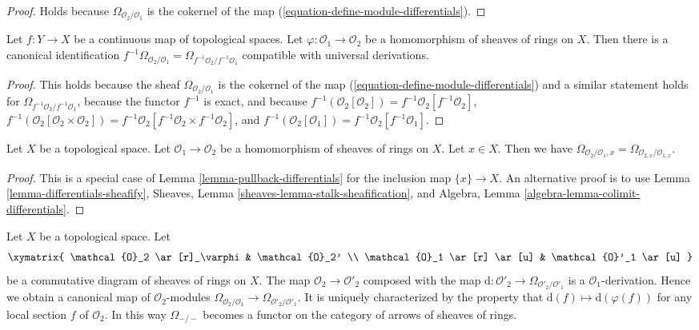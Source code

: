 \begin{proof}
Holds because $\Omega_{\mathcal{O}_2/\mathcal{O}_1}$
is the cokernel of the map (\ref{equation-define-module-differentials}).
\end{proof}

\begin{lemma}
\label{lemma-pullback-differentials}
Let $f : Y \to X$ be a continuous map of topological spaces.
Let $\varphi : \mathcal{O}_1 \to \mathcal{O}_2$
be a homomorphism of sheaves of rings on $X$.
Then there is a canonical identification
$f^{-1}\Omega_{\mathcal{O}_2/\mathcal{O}_1} =
\Omega_{f^{-1}\mathcal{O}_2/f^{-1}\mathcal{O}_1}$
compatible with universal derivations.
\end{lemma}

\begin{proof}
This holds because the sheaf $\Omega_{\mathcal{O}_2/\mathcal{O}_1}$
is the cokernel of the map (\ref{equation-define-module-differentials})
and a similar statement holds for
$\Omega_{f^{-1}\mathcal{O}_2/f^{-1}\mathcal{O}_1}$,
because the functor $f^{-1}$ is exact, and because
$f^{-1}(\mathcal{O}_2[\mathcal{O}_2]) =
f^{-1}\mathcal{O}_2[f^{-1}\mathcal{O}_2]$,
$f^{-1}(\mathcal{O}_2[\mathcal{O}_2 \times \mathcal{O}_2]) =
f^{-1}\mathcal{O}_2[f^{-1}\mathcal{O}_2 \times f^{-1}\mathcal{O}_2]$, and
$f^{-1}(\mathcal{O}_2[\mathcal{O}_1]) =
f^{-1}\mathcal{O}_2[f^{-1}\mathcal{O}_1]$.
\end{proof}

\begin{lemma}
\label{lemma-stalk-module-differentials}
Let $X$ be a topological space. Let $\mathcal{O}_1 \to \mathcal{O}_2$
be a homomorphism of sheaves of rings on $X$. Let $x \in X$. Then we have
$\Omega_{\mathcal{O}_2/\mathcal{O}_1, x} =
\Omega_{\mathcal{O}_{2, x}/\mathcal{O}_{1, x}}$.
\end{lemma}

\begin{proof}
This is a special case of Lemma \ref{lemma-pullback-differentials}
for the inclusion map $\{x\} \to X$. An alternative proof is to use
Lemma \ref{lemma-differentials-sheafify},
Sheaves, Lemma \ref{sheaves-lemma-stalk-sheafification}, and
Algebra, Lemma \ref{algebra-lemma-colimit-differentials}.
\end{proof}

\begin{lemma}
\label{lemma-functoriality-differentials}
Let $X$ be a topological space. Let
$$
\xymatrix{
\mathcal{O}_2 \ar[r]_\varphi & \mathcal{O}_2' \\
\mathcal{O}_1 \ar[r] \ar[u] & \mathcal{O}'_1 \ar[u]
}
$$
be a commutative diagram of sheaves of rings on $X$. The map
$\mathcal{O}_2 \to \mathcal{O}'_2$ composed with the map
$\text{d} : \mathcal{O}'_2 \to \Omega_{\mathcal{O}'_2/\mathcal{O}'_1}$
is a $\mathcal{O}_1$-derivation. Hence we obtain a canonical map of
$\mathcal{O}_2$-modules
$\Omega_{\mathcal{O}_2/\mathcal{O}_1} \to
\Omega_{\mathcal{O}'_2/\mathcal{O}'_1}$.
It is uniquely characterized by the property that
$\text{d}(f) \mapsto \text{d}(\varphi(f))$
for any local section $f$ of $\mathcal{O}_2$.
In this way $\Omega_{-/-}$ becomes a functor on the category
of arrows of sheaves of rings.
\end{lemma}

